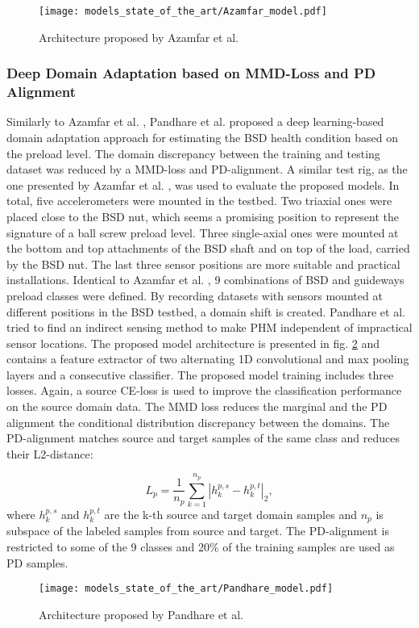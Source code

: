 \begin{figure}[H]
  \centering
  \texttt{[image: models\_state\_of\_the\_art/Azamfar\_model.pdf]}
  \caption{Architecture proposed by Azamfar et al. \cite{AZAMFAR2020103932}}
  \label{fig:Azamfar_model}
\end{figure}


\subsubsection{Deep Domain Adaptation based on MMD-Loss and PD Alignment}
Similarly to Azamfar et al. \cite{AZAMFAR2020103932}, Pandhare et al. \cite{Pandhare2021} proposed a deep learning-based domain adaptation approach for estimating the BSD health condition based on the preload level. The domain discrepancy between the training and testing dataset was reduced by a MMD-loss and PD-alignment. A similar test rig, as the one presented by Azamfar et al. \cite{AZAMFAR2020103932}, was used to evaluate the proposed models. In total, five accelerometers were mounted in the testbed. Two triaxial ones were placed close to the BSD nut, which seems a promising position to represent the signature of a ball screw preload level. Three single-axial ones were mounted at the bottom and top attachments of the BSD shaft and on top of the load, carried by the BSD nut. The last three sensor positions are more suitable and practical installations. Identical to Azamfar et al. \cite{AZAMFAR2020103932}, 9 combinations of BSD and guideways preload classes were defined. By recording datasets with sensors mounted at different positions in the BSD testbed, a domain shift is created. Pandhare et al. \cite{Pandhare2021} tried to find an indirect sensing method to make PHM independent of impractical sensor locations. The proposed model architecture is presented in fig. \ref{fig:Pandhare_model} and contains a feature extractor of two alternating 1D convolutional and max pooling layers and a consecutive classifier. The proposed model training includes three losses. Again, a source CE-loss is used to improve the classification performance on the source domain data. The MMD loss reduces the marginal and the PD alignment the conditional distribution discrepancy between the domains. The PD-alignment matches source and target samples of the same class and reduces their L2-distance: 

\begin{equation}
    L_{p} = \frac{1}{n_{p}}\sum_{k=1}^{n_{p}}|h_{k}^{p,s}-h_{k}^{p,t}|_{2}, 
\end{equation}
where $h_{k}^{p,s}$ and $h_{k}^{p,t}$ are the k-th source and target domain samples and $n_{p}$ is subspace of the labeled samples from source and target. The PD-alignment is restricted to some of the 9 classes and 20\% of the training samples are used as PD samples.
\begin{figure}[H]
  \centering
  \texttt{[image: models\_state\_of\_the\_art/Pandhare\_model.pdf]}
  \caption{Architecture proposed by Pandhare et al. \cite{Pandhare2021}}
  \label{fig:Pandhare_model}
\end{figure}

